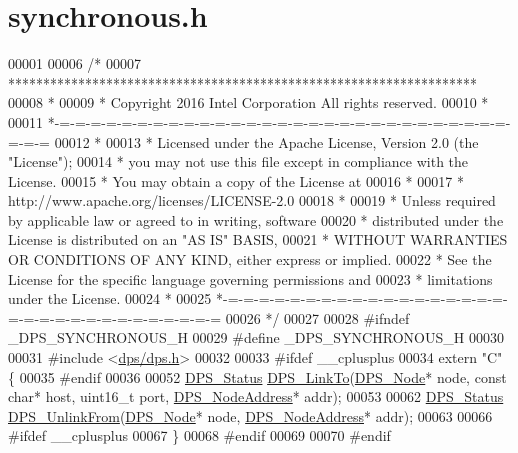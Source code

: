 \hypertarget{synchronous_8h_source}{}\section{synchronous.\+h}
\label{synchronous_8h_source}

\begin{DoxyCode}
00001 
00006 \textcolor{comment}{/*}
00007 \textcolor{comment}{ *******************************************************************}
00008 \textcolor{comment}{ *}
00009 \textcolor{comment}{ * Copyright 2016 Intel Corporation All rights reserved.}
00010 \textcolor{comment}{ *}
00011 \textcolor{comment}{ *-=-=-=-=-=-=-=-=-=-=-=-=-=-=-=-=-=-=-=-=-=-=-=-=-=-=-=-=-=-=-=-=}
00012 \textcolor{comment}{ *}
00013 \textcolor{comment}{ * Licensed under the Apache License, Version 2.0 (the "License");}
00014 \textcolor{comment}{ * you may not use this file except in compliance with the License.}
00015 \textcolor{comment}{ * You may obtain a copy of the License at}
00016 \textcolor{comment}{ *}
00017 \textcolor{comment}{ *      http://www.apache.org/licenses/LICENSE-2.0}
00018 \textcolor{comment}{ *}
00019 \textcolor{comment}{ * Unless required by applicable law or agreed to in writing, software}
00020 \textcolor{comment}{ * distributed under the License is distributed on an "AS IS" BASIS,}
00021 \textcolor{comment}{ * WITHOUT WARRANTIES OR CONDITIONS OF ANY KIND, either express or implied.}
00022 \textcolor{comment}{ * See the License for the specific language governing permissions and}
00023 \textcolor{comment}{ * limitations under the License.}
00024 \textcolor{comment}{ *}
00025 \textcolor{comment}{ *-=-=-=-=-=-=-=-=-=-=-=-=-=-=-=-=-=-=-=-=-=-=-=-=-=-=-=-=-=-=-=-=}
00026 \textcolor{comment}{ */}
00027 
00028 \textcolor{preprocessor}{#ifndef \_DPS\_SYNCHRONOUS\_H}
00029 \textcolor{preprocessor}{#define \_DPS\_SYNCHRONOUS\_H}
00030 
00031 \textcolor{preprocessor}{#include <\hyperlink{dps_8h}{dps/dps.h}>}
00032 
00033 \textcolor{preprocessor}{#ifdef \_\_cplusplus}
00034 \textcolor{keyword}{extern} \textcolor{stringliteral}{"C"} \{
00035 \textcolor{preprocessor}{#endif}
00036 
00052 \hyperlink{group__status_ga30395a84d3cad9d4ec29848106415038}{DPS\_Status} \hyperlink{group__node_ga0bd13b2bd395bbc7807ecc899a8862f1}{DPS\_LinkTo}(\hyperlink{group__node_ga4dd612ab965134321bb57fdb065f121c}{DPS\_Node}* node, \textcolor{keyword}{const} \textcolor{keywordtype}{char}* host, uint16\_t port, 
      \hyperlink{group__nodeaddress_ga9e9f56aa38e82b4edcef7eb81e9f5bd2}{DPS\_NodeAddress}* addr);
00053 
00062 \hyperlink{group__status_ga30395a84d3cad9d4ec29848106415038}{DPS\_Status} \hyperlink{group__node_ga2d5bb0528c2a171991ad6355cbadac69}{DPS\_UnlinkFrom}(\hyperlink{group__node_ga4dd612ab965134321bb57fdb065f121c}{DPS\_Node}* node, 
      \hyperlink{group__nodeaddress_ga9e9f56aa38e82b4edcef7eb81e9f5bd2}{DPS\_NodeAddress}* addr);
00063 
00066 \textcolor{preprocessor}{#ifdef \_\_cplusplus}
00067 \}
00068 \textcolor{preprocessor}{#endif}
00069 
00070 \textcolor{preprocessor}{#endif}
\end{DoxyCode}

